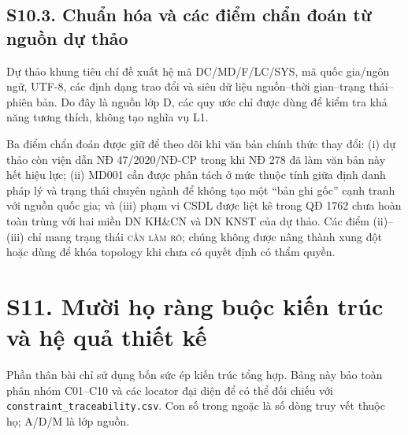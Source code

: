 \documentclass[a4paper,11pt]{article}
\begin{document}
\subsection*{S10.3. Chuẩn hóa và các điểm chẩn đoán từ nguồn dự thảo}
Dự thảo khung tiêu chí đề xuất hệ mã DC/MD/F/LC/SYS, mã quốc gia/ngôn ngữ, UTF-8, các định dạng trao đổi và siêu dữ liệu nguồn--thời gian--trạng thái--phiên bản. Do đây là nguồn lớp D, các quy ước chỉ được dùng để kiểm tra khả năng tương thích, không tạo nghĩa vụ L1.

Ba điểm chẩn đoán được giữ để theo dõi khi văn bản chính thức thay đổi: (i) dự thảo còn viện dẫn NĐ 47/2020/NĐ-CP trong khi NĐ 278 đã làm văn bản này hết hiệu lực; (ii) MD001 cần được phân tách ở mức thuộc tính giữa định danh pháp lý và trạng thái chuyên ngành để không tạo một ``bản ghi gốc'' cạnh tranh với nguồn quốc gia; và (iii) phạm vi CSDL được liệt kê trong QĐ 1762 chưa hoàn toàn trùng với hai miền DN KH\&CN và DN KNST của dự thảo. Các điểm (ii)--(iii) chỉ mang trạng thái \textsc{cần làm rõ}; chúng không được nâng thành xung đột hoặc dùng để khóa topology khi chưa có quyết định có thẩm quyền.



\section*{S11. Mười họ ràng buộc kiến trúc và hệ quả thiết kế}
Phần thân bài chỉ sử dụng bốn sức ép kiến trúc tổng hợp. Bảng này bảo toàn phân nhóm C01--C10 và các locator đại diện để có thể đối chiếu với \texttt{constraint\_traceability.}\allowbreak\texttt{csv}. Con số trong ngoặc là số dòng truy vết thuộc họ; A/D/M là lớp nguồn.
\end{document}
